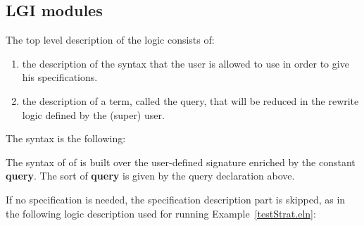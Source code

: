 %


\subsection{LGI modules}
\label{subsec.lgi.module}

The top level description of the logic consists of:
\begin{enumerate}
\item the description of the syntax that the user is allowed to use in
        order to give his specifications.
\item the description of a term, called the query, that will be reduced
        in the rewrite logic defined by the (super) user.
\end{enumerate}

The syntax is the following:




The syntax of of  is built over the user-defined
signature enriched by the constant {\bf query}. The sort of {\bf
query} is given by the query declaration above.

\EX If no specification is needed, the specification description part
is skipped, as in the 
following logic description used for running
Example~\ref{testStrat.eln}:\\

